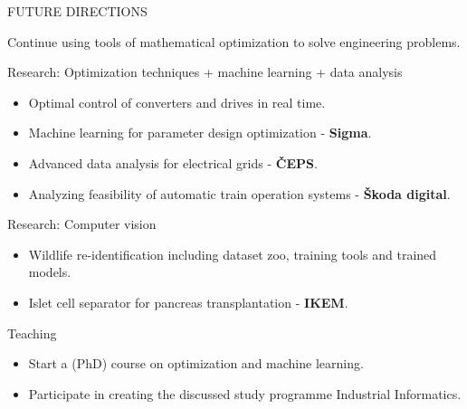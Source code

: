 \documentclass[11pt, aspectratio=169]{beamer}
\newenvironment{wideitemize}{\itemize\addtolength{\itemsep}{10pt}}{\enditemize}
\begin{document}


\begin{frame}{FUTURE DIRECTIONS}
\begin{wideitemize}
\item Continue using tools of mathematical optimization to solve engineering problems.
\item Research: Optimization techniques + machine learning + data analysis
\begin{itemize}
\item Optimal control of converters and drives in real time.
\item Machine learning for parameter design optimization - \textbf{Sigma}.
\item Advanced data analysis for electrical grids - \textbf{ČEPS}.
\pause \item Analyzing feasibility of automatic train operation systems - \textbf{Škoda digital}.
\end{itemize}
\pause \item Research: Computer vision
\begin{itemize}
\item Wildlife re-identification including dataset zoo, training tools and trained models.
\pause \item Islet cell separator for pancreas transplantation - \textbf{IKEM}.
\end{itemize}
\pause \item Teaching
\begin{itemize}
\item Start a (PhD) course on optimization and machine learning.
\pause \item Participate in creating the discussed study programme Industrial Informatics.
\end{itemize}
\end{wideitemize}
\end{frame}


\begin{frame}
\end{frame}
\end{document}
